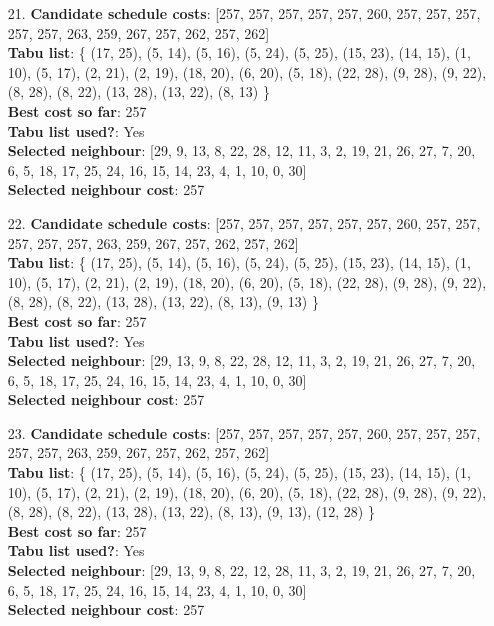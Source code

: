 \documentclass[fleqn]{article}
\begin{document}
\begin{itemize}
    \item[21.] \textbf{Candidate schedule costs}: [257, 257, 257, 257, 257, 260, 257, 257, 257, 257, 257, 263, 259, 267, 257, 262, 257, 262] \\
    \textbf{Tabu list}: \{ (17, 25), (5, 14), (5, 16), (5, 24), (5, 25), (15, 23), (14, 15), (1, 10), (5, 17), (2, 21), (2, 19), (18, 20), (6, 20), (5, 18), (22, 28), (9, 28), (9, 22), (8, 28), (8, 22), (13, 28), (13, 22), (8, 13) \} \\
    \textbf{Best cost so far}: 257 \\
    \textbf{Tabu list used?}: Yes \\
    \textbf{Selected neighbour}: [29, 9, 13, 8, 22, 28, 12, 11, 3, 2, 19, 21, 26, 27, 7, 20, 6, 5, 18, 17, 25, 24, 16, 15, 14, 23, 4, 1, 10, 0, 30] \\
    \textbf{Selected neighbour cost}: 257
      

    \item[22.] \textbf{Candidate schedule costs}: [257, 257, 257, 257, 257, 257, 260, 257, 257, 257, 257, 257, 263, 259, 267, 257, 262, 257, 262] \\
    \textbf{Tabu list}: \{ (17, 25), (5, 14), (5, 16), (5, 24), (5, 25), (15, 23), (14, 15), (1, 10), (5, 17), (2, 21), (2, 19), (18, 20), (6, 20), (5, 18), (22, 28), (9, 28), (9, 22), (8, 28), (8, 22), (13, 28), (13, 22), (8, 13), (9, 13) \} \\
    \textbf{Best cost so far}: 257 \\
    \textbf{Tabu list used?}: Yes \\
    \textbf{Selected neighbour}: [29, 13, 9, 8, 22, 28, 12, 11, 3, 2, 19, 21, 26, 27, 7, 20, 6, 5, 18, 17, 25, 24, 16, 15, 14, 23, 4, 1, 10, 0, 30] \\
    \textbf{Selected neighbour cost}: 257
      

    \item[23.] \textbf{Candidate schedule costs}: [257, 257, 257, 257, 257, 260, 257, 257, 257, 257, 257, 263, 259, 267, 257, 262, 257, 262] \\
    \textbf{Tabu list}: \{ (17, 25), (5, 14), (5, 16), (5, 24), (5, 25), (15, 23), (14, 15), (1, 10), (5, 17), (2, 21), (2, 19), (18, 20), (6, 20), (5, 18), (22, 28), (9, 28), (9, 22), (8, 28), (8, 22), (13, 28), (13, 22), (8, 13), (9, 13), (12, 28) \} \\
    \textbf{Best cost so far}: 257 \\
    \textbf{Tabu list used?}: Yes \\
    \textbf{Selected neighbour}: [29, 13, 9, 8, 22, 12, 28, 11, 3, 2, 19, 21, 26, 27, 7, 20, 6, 5, 18, 17, 25, 24, 16, 15, 14, 23, 4, 1, 10, 0, 30] \\
    \textbf{Selected neighbour cost}: 257
      


\end{itemize}
\end{document}
